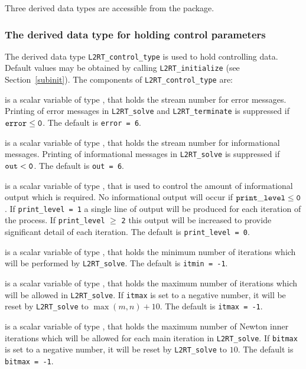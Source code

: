 \documentclass{galahad}
\newcommand{\packagename}{L2\-RT}
\begin{document}
\galtypes
Three derived data types are accessible from the package.


\subsubsection{The derived data type for holding control
 parameters}\label{typecontrol}
The derived data type
{\tt \packagename\_control\_type}
is used to hold controlling data. Default values may be obtained by calling
{\tt \packagename\_initialize}
(see Section~\ref{subinit}). The components of
{\tt \packagename\_control\_type}
are:

\begin{description}
 is a scalar variable of type \integer, that holds the
stream number for error messages.
Printing of error messages in
{\tt \packagename\_solve} and {\tt \packagename\_terminate}
is suppressed if ${\tt error} \leq {\tt 0}$.
The default is {\tt error = 6}.

 is a scalar variable of type \integer, that holds the
stream number for informational messages.
Printing of informational messages in
{\tt \packagename\_solve} is suppressed if ${\tt out} < {\tt 0}$.
The default is {\tt out = 6}.

 is a scalar variable of type \integer,
that is used
to control the amount of informational output which is required. No
informational output will occur if ${\tt print\_level} \leq {\tt 0}$. If
{\tt print\_level = 1} a single line of output will be produced for each
iteration of the process. If {\tt print\_level} $\geq$ {\tt 2} this output
will be increased to provide significant detail of each iteration.
The default is {\tt print\_level = 0}.

 is a scalar variable of type \integer, that holds the
minimum number of iterations which will be performed by
{\tt \packagename\_solve}.
The default is {\tt itmin = -1}.

 is a scalar variable of type \integer, that holds the
maximum number of iterations which will be allowed in
{\tt \packagename\_solve}.
If {\tt itmax} is set to a negative number, it will be reset by
{\tt \packagename\_solve} to $\max(m,n)+10$.
The default is {\tt itmax = -1}.

 is a scalar variable of type \integer, that holds the
maximum number of Newton inner iterations which will be allowed for each
main iteration in {\tt \packagename\_solve}.
If {\tt bitmax} is set to a negative number, it will be reset by
{\tt \packagename\_solve} to $10$.
The default is {\tt bitmax = -1}.


\end{description}
\end{document}

